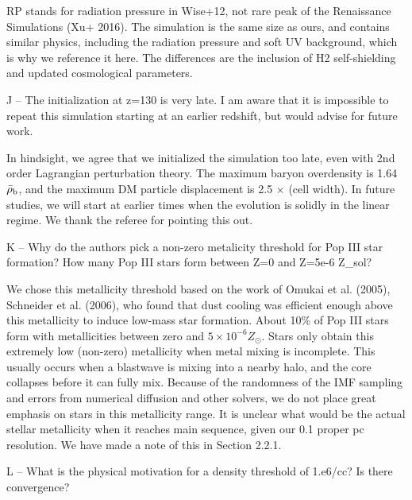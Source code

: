 \documentclass[11pt]{article}
\newenvironment{referee}[1][]{%
    \ignorespaces%
    \begin{mdframed}[style=myquotestyle,#1]%
}{%
    \end{mdframed}%
    \ignorespacesafterend%
}%
\begin{document}
RP stands for radiation pressure in Wise+12, not rare peak of the Renaissance Simulations (Xu+ 2016). The simulation is the same size as ours, and contains similar physics, including the radiation pressure and soft UV background, which is why we reference it here. The differences are the inclusion of H2 self-shielding and updated cosmological parameters.
 
\begin{referee}
J -- The initialization at z=130 is very late. I am aware that it is impossible to repeat this simulation starting at an earlier redshift, but would advise for future work.
\end{referee}

In hindsight, we agree that we initialized the simulation too late, even with 2nd order Lagrangian perturbation theory.  The maximum baryon overdensity is 1.64$\bar{\rho}_{\rm b}$, and the maximum DM particle displacement is 2.5 $\times$ (cell width).  In future studies, we will start at earlier times when the evolution is solidly in the linear regime.  We thank the referee for pointing this out.

\begin{referee}
K -- Why do the authors pick a non-zero metalicity threshold for Pop III star formation? How many Pop III stars form between Z=0 and Z=5e-6 Z\_sol?
\end{referee}

We chose this metallicity threshold based on the work of Omukai et al. (2005), Schneider et al. (2006), who found that dust cooling was efficient enough above this metallicity to induce low-mass star formation. About 10\% of Pop III stars form with metallicities between zero and $5 \times 10^{-6} Z_\odot$.  Stars only obtain this extremely low (non-zero) metallicity when metal mixing is incomplete.  This usually occurs when a blastwave is mixing into a nearby halo, and the core collapses before it can fully mix.  Because of the randomness of the IMF sampling and errors from numerical diffusion and other solvers, we do not place great emphasis on stars in this metallicity range.  It is unclear what would be the actual stellar metallicity when it reaches main sequence, given our 0.1 proper pc resolution.  We have made a note of this in Section 2.2.1.

\begin{referee}
L -- What is the physical motivation for a density threshold of 1.e6/cc? Is there convergence?
\end{referee}
\end{document}
